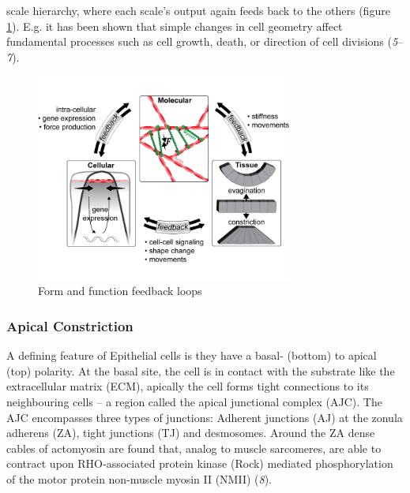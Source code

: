 \documentclass[11pt,singlespacinge,twoside]{reedthesis} %
\begin{document}
scale hierarchy, where each scale's output again feeds back to the others (figure \ref{fig:feedb}). E.g. it has been shown that simple changes in cell geometry affect fundamental processes such as cell growth, death, or direction of cell divisions (\emph{5}--\emph{7}).
\begin{figure}

{\centering \includegraphics[width=0.75\textwidth]{figures/intro/feedback} 

}

\caption{Form and function feedback loops}\label{fig:feedb}
\end{figure}
\hypertarget{apical-constriction}{%
\subsubsection{Apical Constriction}\label{apical-constriction}}

A defining feature of Epithelial cells is they have a basal- (bottom) to apical (top) polarity. At the basal site, the cell is in contact with the substrate like the extracellular matrix (ECM), apically the cell forms tight connections to its neighbouring cells -- a region called the apical junctional complex (AJC). The AJC encompasses three types of junctions: Adherent junctions (AJ) at the zonula adherens (ZA), tight junctions (TJ) and desmosomes. Around the ZA dense cables of actomyosin are found that, analog to muscle sarcomeres, are able to contract upon RHO‑associated protein kinase (Rock) mediated phosphorylation of the motor protein non-muscle myosin II (NMII) (\emph{8}).
\end{document}

